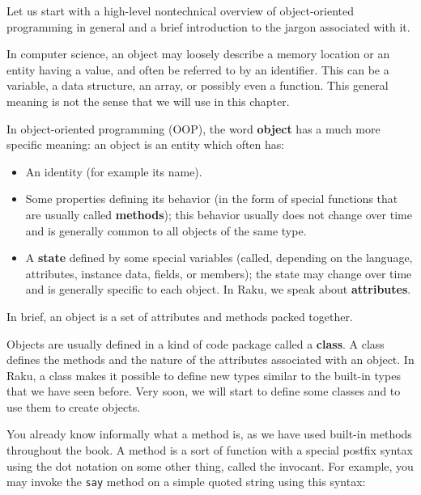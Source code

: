 Let us start with a high-level nontechnical overview 
of object-oriented programming in general and a brief 
introduction to the jargon associated with it.

In computer science, an object may loosely describe a memory 
location or an entity having a value, and often be referred to 
by an identifier. This can be a variable, a data structure, 
an array, or possibly even a function. This general meaning 
is not the sense that we will use in this chapter.

In object-oriented programming (OOP), the word {\bf object} 
has a much more specific meaning: an object is an entity 
which often has:
\begin{itemize}

\item An identity (for example its name).

\item Some properties defining its behavior (in the form of 
special functions that are usually called {\bf methods}); this 
behavior usually does not change over time and is generally 
common to all objects of the same type.

\item A {\bf state} defined by some special variables (called, 
depending on the language, attributes, instance data, fields, 
or members); the state may change over time and is generally 
specific to each object. In Raku, we speak about 
{\bf attributes}.
\end{itemize}

In brief, an object is a set of attributes and methods packed 
together.

Objects are usually defined in a kind of code package called 
a {\bf class}. A class defines the methods and the nature of 
the attributes associated with an object. In Raku, a class makes it 
possible to define new types similar to the built-in types 
that we have seen before. Very soon, we will start to define 
some classes and to use them to create objects.

You already know informally what a method is, as we have 
used built-in methods throughout the book. A method is a sort of 
function with a special postfix syntax using the dot notation 
on some other thing, called the invocant. For example, you may invoke the {\tt say} 
method on a simple quoted string using this syntax:

